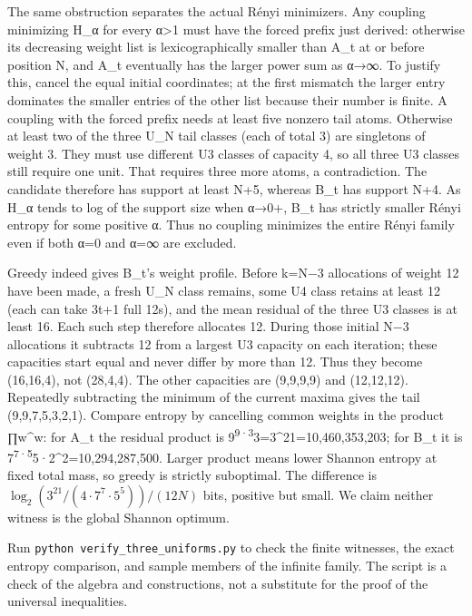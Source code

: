 \documentclass[11pt]{article}
\begin{document}
The same obstruction separates the actual Rényi minimizers. Any coupling minimizing H\_α for every α\textgreater1 must have the forced prefix just derived: otherwise its decreasing weight list is lexicographically smaller than A\_t at or before position N, and A\_t eventually has the larger power sum as α→∞. To justify this, cancel the equal initial coordinates; at the first mismatch the larger entry dominates the smaller entries of the other list because their number is finite. A coupling with the forced prefix needs at least five nonzero tail atoms. Otherwise at least two of the three U\_N tail classes (each of total 3) are singletons of weight 3. They must use different U3 classes of capacity 4, so all three U3 classes still require one unit. That requires three more atoms, a contradiction. The candidate therefore has support at least N+5, whereas B\_t has support N+4. As H\_α tends to log of the support size when α→0+, B\_t has strictly smaller Rényi entropy for some positive α. Thus no coupling minimizes the entire Rényi family even if both α=0 and α=∞ are excluded.

Greedy indeed gives B\_t's weight profile. Before k=N−3 allocations of weight 12 have been made, a fresh U\_N class remains, some U4 class retains at least 12 (each can take 3t+1 full 12s), and the mean residual of the three U3 classes is at least 16. Each such step therefore allocates 12. During those initial N−3 allocations it subtracts 12 from a largest U3 capacity on each iteration; these capacities start equal and never differ by more than 12. Thus they become (16,16,4), not (28,4,4). The other capacities are (9,9,9,9) and (12,12,12). Repeatedly subtracting the minimum of the current maxima gives the tail (9,9,7,5,3,2,1). Compare entropy by cancelling common weights in the product ∏w\^{}w: for A\_t the residual product is 9\textsuperscript{9·3}3=3\^{}21=10,460,353,203; for B\_t it is 7\textsuperscript{7·5}5·2\^{}2=10,294,287,500. Larger product means lower Shannon entropy at fixed total mass, so greedy is strictly suboptimal. The difference is \(\log_2(3^{21}/(4\cdot 7^7\cdot 5^5))/(12N)\) bits, positive but small. We claim neither witness is the global Shannon optimum.

Run \texttt{python\ verify\_three\_uniforms.py} to check the finite witnesses, the exact entropy comparison, and sample members of the infinite family. The script is a check of the algebra and constructions, not a substitute for the proof of the universal inequalities.
\end{document}
